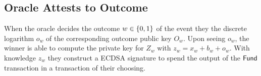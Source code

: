 \documentclass[runningheads]{llncs}
\begin{document}
\begin{center}
  \end{center}


\subsection{Oracle Attests to Outcome}

When the oracle decides the outcome $w \in \{0,1\}$ of the event they the discrete logarithm $o_w$ of the corresponding outcome public key $O_w$. Upon seeing $o_w$, the winner is able to compute the private key for $Z_w$ with $z_w = x_w + b_w + o_w$. With knowledge $z_w$ they construct a ECDSA signature to spend the output of the $\textsf{Fund}$ transaction in a transaction of their choosing.






\end{document}
